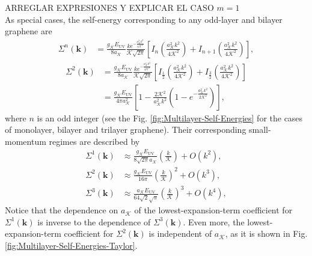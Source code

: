 \documentclass[english,aps,prd,nofootinbib,twocolumn]{revtex4-1}
\begin{document}
	ARREGLAR EXPRESIONES Y EXPLICAR EL CASO $m=1$
\\

As special cases, the self-energy corresponding to any odd-layer and bilayer graphene are
\begin{equation}
\begin{split}
\!\!\!\!\Sigma^{n}\!(\mathbf{k })
\! &= \!
\frac{g_{\mathcal{K}}E_{\mathrm{UV}}}{8a_{\mathcal{K}}}
\frac{k e^{-\frac{a_{\mathcal{K}}^{2}k^{2}}{4\mathcal{K}^{2}}}}{\mathcal{K}\sqrt{2\pi}}
\!\!
\left[ 
\!
I_{n}\!\!
\left(\!
\frac{a_{\mathcal{K}}^{2}k^{2}}{4\mathcal{K}^{2}}
\!\right)
\!\! + \!
I_{n+1}\!\!
\left(\!
\frac{a_{\mathcal{K}}^{2}k^{2}}{4\mathcal{K}^{2}}
\!\right)
\!
\right]
\!
,
\end{split}
\end{equation}
\begin{equation}
\begin{split}
\Sigma^{2}(\mathbf{k })
\! &= \!
\frac{g_{\mathcal{K}}E_{\mathrm{UV}}}{8a_{\mathcal{K}}}
\frac{k e^{-\frac{a_{\mathcal{K}}^{2}k^{2}}{4\mathcal{K}^{2}}}}{\mathcal{K}\sqrt{2\pi}}
\!\!
\left[ 
I_{\frac{1}{2}}\!\!
\left(\!
\frac{a_{\mathcal{K}}^{2}k^{2}}{4\mathcal{K}^{2}}
\!\right)
\!\! + \!
I_{\frac{3}{2}}\!\!
\left(\!
\frac{a_{\mathcal{K}}^{2}k^{2}}{4\mathcal{K}^{2}}
\!\right)
\!
\right]
\! \\ &= \!
\frac{g_{\mathcal{K}}E_{\mathrm{UV}}}{4\pi a_{\mathcal{K}}^{2}}
\left[
1 - 
\frac{2\mathcal{K}^{2}}{a_{\mathcal{K}}^{2}k^{2}}
\left(
1-e^{-\frac{a_{\mathcal{K}}^{2}k^{2}}{2\mathcal{K}^{2}}}
\right)
\right]
\!
,
\end{split}
\end{equation}
where $n$ is an odd integer (see the Fig. \ref{fig:Multilayer-Self-Energies} for the cases of monolayer, bilayer and trilayer graphene). Their corresponding small-momentum regimes are described by
\begin{equation}
\begin{split}
\Sigma^{1}\!(\mathbf{k })
 &\approx 
\frac{g_{\mathcal{K}}E_{\mathrm{UV}}}
{8 \sqrt{2 \pi } a_{\mathcal{K}}}
\!
\left( \frac{k}{\mathcal{K}} \right)
+ O(k^{2})
, \\
\Sigma^{2}(\mathbf{k })
 &\approx 
\frac{g_{\mathcal{K}}E_{\mathrm{UV}}}
{16\pi }
\!\! 
\left( \frac{k}{\mathcal{K}} \right)^2
\!\!
+ O(k^{3})
, \\
\Sigma^{3}(\mathbf{k })
 &\approx 
\frac{a_{\mathcal{K}} E_{\mathrm{UV}}}
{64 \sqrt{2} \sqrt{\pi }}
\!\! 
\left( \frac{k}{\mathcal{K}} \right)^3
\!\!
+ O(k^{4})
,
\end{split}
\end{equation}
Notice that the dependence on $a_{\mathcal{K}}$ of the lowest-expansion-term coefficient for $\Sigma^{1}(\mathbf{k })$ is inverse to the dependence of $\Sigma^{3}(\mathbf{k })$. Even more, the lowest-expansion-term coefficient for $\Sigma^{2}(\mathbf{k })$ is independent of $a_{\mathcal{K}}$, as it is shown in Fig. \ref{fig:Multilayer-Self-Energies-Taylor}. 
\end{document}
